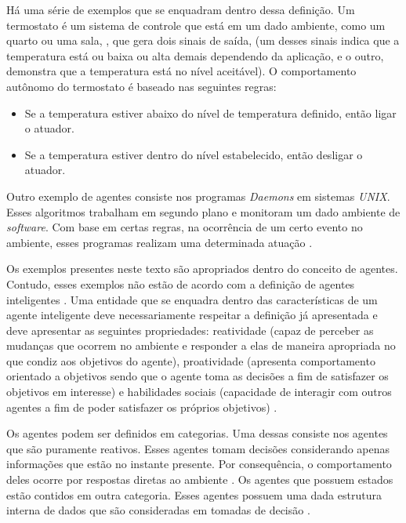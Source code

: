 Há uma série de exemplos que se enquadram dentro dessa definição. Um termostato é um sistema de controle que está em um dado ambiente, como um quarto ou uma sala, \cite{whatisagent}, que gera dois sinais de saída, (um desses sinais indica que a temperatura está ou baixa ou alta demais dependendo da aplicação, e o outro, demonstra que a temperatura está no nível aceitável). O comportamento autônomo do termostato é baseado nas seguintes regras:

\begin{itemize}
    \item Se a temperatura estiver abaixo do nível de temperatura definido, então ligar o atuador.
    \item Se a temperatura estiver dentro do nível estabelecido, então desligar o atuador.
\end{itemize}

Outro exemplo de agentes consiste nos programas \textit{Daemons} em sistemas \textit{UNIX}. Esses algoritmos trabalham em segundo plano e monitoram um dado ambiente de \textit{software}. Com base em certas regras, na ocorrência de um certo evento no ambiente, esses programas realizam uma determinada atuação \cite{whatisagent}.   

Os exemplos presentes neste texto são apropriados dentro do conceito de agentes. Contudo, esses exemplos não estão de acordo com a definição de agentes inteligentes \cite{whatisagent}. Uma entidade que se enquadra dentro das características de um agente inteligente deve necessariamente respeitar a definição já apresentada e deve apresentar as seguintes propriedades: reatividade (capaz de perceber as mudanças
que ocorrem no ambiente e responder a elas de maneira apropriada no que condiz aos objetivos do agente), proatividade (apresenta comportamento orientado a objetivos sendo que o agente toma as decisões a fim de satisfazer os objetivos em interesse) e habilidades sociais (capacidade de interagir com outros agentes a fim de poder satisfazer os próprios objetivos) \cite{whatisagent} \cite{artificialinteligencemodermapproach}.

Os agentes podem ser definidos em categorias. Uma dessas consiste nos agentes que são puramente reativos. Esses agentes tomam decisões considerando apenas informações que estão no instante presente. Por consequência, o comportamento deles ocorre por respostas diretas ao ambiente \cite{whatisagent}. Os agentes que possuem estados estão contidos em outra categoria. Esses agentes possuem uma dada estrutura interna de dados que são consideradas em tomadas de decisão \cite{whatisagent}.

